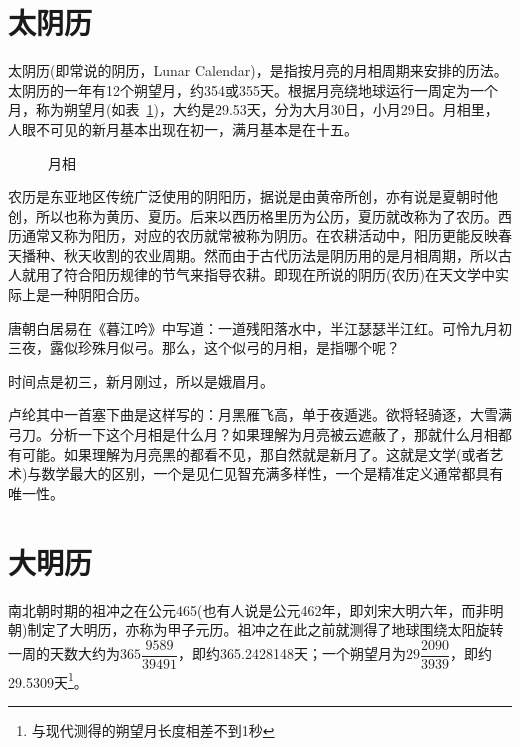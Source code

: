 \section{太阴历}
\label{sec:tai-yin-calendar}

太阴历(即常说的阴历，Lunar Calendar)，是指按月亮的月相周期来安排的历法。太阴历的一年有12个朔望月，约354或355天。根据月亮绕地球运行一周定为一个月，称为朔望月(如表~\ref{fig:lunar-phases})，大约是29.53天，分为大月30日，小月29日。月相里，人眼不可见的新月基本出现在初一，满月基本是在十五。

\begin{figure}[htbp]
  \centering
  \scalebox{0.75}{}
  \caption{月相}
  \label{fig:lunar-phases}
\end{figure}

农历是东亚地区传统广泛使用的阴阳历，据说是由黄帝所创，亦有说是夏朝时他创，所以也称为黄历、夏历。后来以西历格里历为公历，夏历就改称为了农历。西历通常又称为阳历，对应的农历就常被称为阴历。在农耕活动中，阳历更能反映春天播种、秋天收割的农业周期。然而由于古代历法是阴历用的是月相周期，所以古人就用了符合阳历规律的节气来指导农耕。即现在所说的阴历(农历)在天文学中实际上是一种阴阳合历。


\begin{example}
  唐朝白居易在《暮江吟》中写道：一道残阳落水中，半江瑟瑟半江红。可怜九月初三夜，露似珍殊月似弓。那么，这个似弓的月相，是指哪个呢？

  时间点是初三，新月刚过，所以是娥眉月。
\end{example}

\begin{example}
  卢纶其中一首塞下曲是这样写的：月黑雁飞高，单于夜遁逃。欲将轻骑逐，大雪满弓刀。分析一下这个月相是什么月？如果理解为月亮被云遮蔽了，那就什么月相都有可能。如果理解为月亮黑的都看不见，那自然就是新月了。这就是文学(或者艺术)与数学最大的区别，一个是见仁见智充满多样性，一个是精准定义通常都具有唯一性。
\end{example}


\section{大明历}
\label{sec:da-ming-calendar}

南北朝时期的祖冲之在公元465(也有人说是公元462年，即刘宋大明六年，而非明朝)制定了大明历，亦称为甲子元历。祖冲之在此之前就测得了地球围绕太阳旋转一周的天数大约为$365\dfrac{9589}{39491}$，即约365.2428148天；一个朔望月为$29\dfrac{2090}{3939}$，即约29.5309天\footnote{与现代测得的朔望月长度相差不到1秒}。

